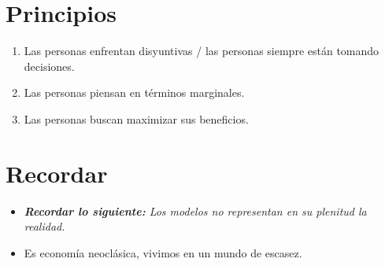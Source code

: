 \section{Principios}
\begin{enumerate}
    \item Las personas enfrentan disyuntivas / las personas siempre están tomando decisiones.
    \item Las personas piensan en términos marginales.
    \item Las personas buscan maximizar sus beneficios.
\end{enumerate}


\section{Recordar}
\begin{itemize}
    \item \emph{\textbf{Recordar lo siguiente: }Los modelos no representan en su plenitud la realidad.}
    \item Es economía neoclásica, vivimos en un mundo de escasez.
\end{itemize}
